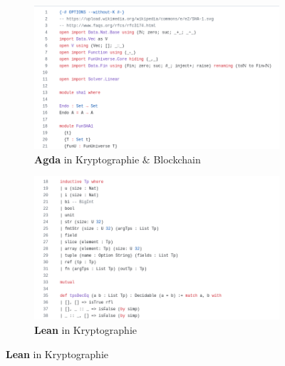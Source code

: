 \documentclass{beamer}
\theoremstyle{definition}
\theoremstyle{remark}
\begin{document}
\begin{frame}
\begin{figure}
		\vspace{0.2cm} %
		\begin{subfigure}[b]{0.45\textwidth}
						\includegraphics[width=\textwidth]{cryptoagda.png}
						\caption{\tiny \textbf{Agda} in Kryptographie $\&$ Blockchain}
		\end{subfigure}
		\hspace{0.5cm}
		\begin{subfigure}[b]{0.45\textwidth}
						\includegraphics[width=\textwidth]{rust.png}
						\caption{\tiny \textbf{Lean} in Kryptographie}
		\end{subfigure}

\end{figure}
\end{frame}
\end{document}
